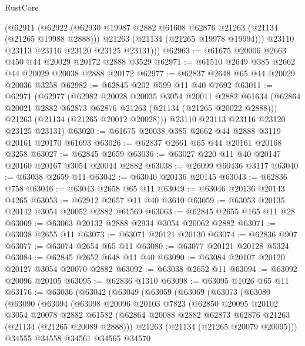 \begin{lexlean}{RustCore}
\begin{coremodule}
        (@62911
          (@62922
            (@62930 @19987 @2882 @61608 @62876 @21263 (@21134 (@21265 @19988 @2888)))
            @21263
            (@21134 (@21265 @19978 @19994)))
          @23110
          @23113
          @23116
          @23120
          @23125
          @23131)))
@62963 := @61675 @20006 @2663 @450 @44 @20029 @20172 @2888 @3529
@62971 := @61510 @2649 @385 @2662 @44 @20029 @20038 @2888 @20172
@62977 := @62837 @2648 @65 @44 @20029 @20036 @3258
@62982 := @62845 @202 @599 @11 @40 @7692
@63011 := @62971
    (@62977
      (@62982
        @20028
        @20035
        @3054
        @20011
        @2882
        @61634
        (@62864 @20021 @2882 @62873 @62876 @21263 (@21134 (@21265 @20022 @2888)))
        @21263
        (@21134 (@21265 @20012 @20028)))
      @23110
      @23113
      @23116
      @23120
      @23125
      @23131)
@63020 := @61675 @20038 @385 @2662 @44 @2888 @3119 @20161 @20170 @61693
@63026 := @62837 @2661 @65 @44 @20161 @20168 @3258
@63027 := @62845 @2659
@63036 := @63027 @220 @11 @40 @20147 @20160 @20167 @3054 @20044 @2882
@63038 := @26099 @60436 @3117
@63040 := @63038 @2659 @11
@63042 := @63040 @20136 @20145
@63043 := @62836 @758
@63046 := @63043 @2658 @65 @11
@63049 := @63046 @20136 @20143 @4265
@63053 := @62912 @2657 @11 @40 @3610
@63059 := @63053 @20135 @20142 @3054 @20052 @2882 @61569
@63063 := @62845 @2655 @165 @11 @28
@63069 := @63063 @20132 @2888 @2934 @3054 @20062 @2882
@63071 := @63038 @2655 @11
@63073 := @63071 @20121 @20130
@63074 := @62836 @907
@63077 := @63074 @2654 @65 @11
@63080 := @63077 @20121 @20128 @5324
@63084 := @62845 @2652 @648 @11 @40
@63090 := @63084 @20107 @20120 @20127 @3054 @20070 @2882
@63092 := @63038 @2652 @11
@63094 := @63092 @20096 @20105
@63095 := @62836 @1310
@63098 := @63095 @1026 @65 @11
@63176 := @63036
    (@63042
      (@63049
        (@63059
          (@63069
            (@63073
              (@63080
                (@63090
                  (@63094
                    (@63098
                      @20096
                      @20103
                      @7823
                      (@62850
                        @20095
                        @20102
                        @3054
                        @20078
                        @2882
                        @61582
                        (@62864 @20088 @2882 @62873 @62876 @21263 (@21134 (@21265 @20089 @2888)))
                        @21263
                        (@21134 (@21265 @20079 @20095)))
                      @34555
                      @34558
                      @34561
                      @34565
                      @34570

\end{coremodule}
\end{lexlean}
